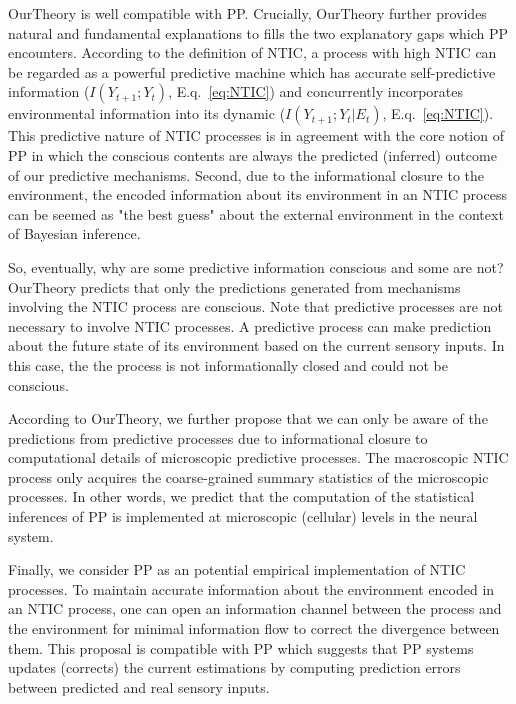 \documentclass[utf8]{article}
\begin{document}
    		\ac{OurTheory} is well compatible with PP. Crucially, \ac{OurTheory} further provides natural and fundamental explanations to fills the two explanatory gaps which PP encounters. According to the definition of NTIC, a process with high NTIC can be regarded as a powerful predictive machine which has accurate self-predictive information ($I(Y_{t+1};Y_{t})$, E.q.~\ref{eq:NTIC}) and concurrently incorporates environmental information into its dynamic ($I(Y_{t+1};Y_{t}|E_{t})$, E.q.~\ref{eq:NTIC}). This predictive nature of NTIC processes is in agreement with the core notion of PP in which the conscious contents are always the predicted (inferred) outcome of our predictive mechanisms. Second, due to the informational closure to the environment, the encoded information about its environment in an NTIC process can be seemed as "the best guess" about the external environment in the context of Bayesian inference. 
    		
    		So, eventually, why are some predictive information conscious and some are not? \ac{OurTheory} predicts that only the predictions generated from mechanisms involving the NTIC process are conscious. Note that predictive processes are not necessary to involve NTIC processes. A predictive process can make prediction about the future state of its environment based on the current sensory inputs. In this case, the the process is not informationally closed and could not be conscious.
    		
            According to \ac{OurTheory}, we further propose that we can only be aware of the predictions from predictive processes due to informational closure to computational details of microscopic predictive processes. The macroscopic NTIC process only acquires the coarse-grained summary statistics of the microscopic processes. In other words, we predict that the computation of the statistical inferences of PP is implemented at microscopic (cellular) levels in the neural system. 
        
    		Finally, we consider PP as an potential empirical implementation of NTIC processes. To maintain accurate information about the environment encoded in an NTIC process, one can open an information channel between the process and the environment for minimal information flow to correct the divergence between them. This proposal is compatible with PP which suggests that PP systems updates (corrects) the current estimations by computing prediction errors between predicted and real sensory inputs. 
\end{document}

